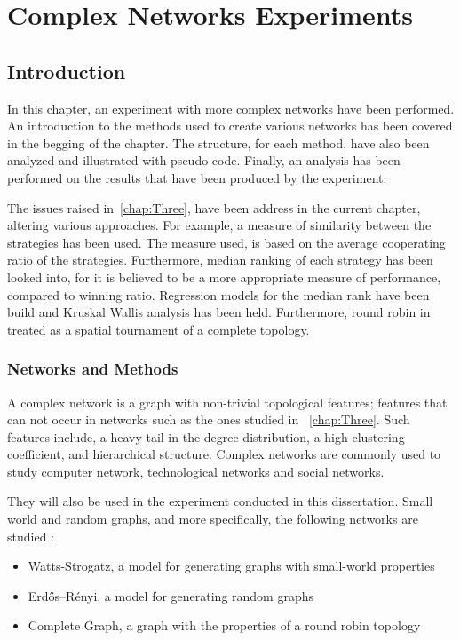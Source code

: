 \chapter{Complex Networks Experiments}
\label{chap:Four}

\section{Introduction}
In this chapter, an experiment with more complex networks have been performed.
An introduction to the methods used to create various networks has been
covered in the begging of the chapter. The structure, for each method,
have also been analyzed and illustrated with pseudo code. Finally, an analysis
has been performed on the results that have been produced by the experiment.

The issues raised in~\ref{chap:Three}, have been address in the current chapter,
altering various approaches. For example, a measure of similarity between the
strategies has been used. The measure used, is based on the average cooperating
ratio of the strategies. Furthermore, median ranking of each strategy has been
looked into, for it is believed to be a more appropriate measure of performance,
compared to winning ratio. Regression models for the median rank have been build
and Kruskal Wallis analysis has been held. Furthermore, round robin in treated as
a spatial tournament of a complete topology.

\subsection{Networks and Methods}
A complex network is a graph with non-trivial topological features;
features that can not occur in networks such as the ones studied in ~\ref{chap:Three}.
Such features include, a heavy tail in the degree distribution, a high
clustering coefficient, and hierarchical structure. Complex networks are commonly
used to study computer network, technological networks and social networks.

They will also be used in the experiment conducted in this dissertation. Small
world and random graphs, and more specifically, the following networks are
studied :

\begin{itemize}
	\item Watts-Strogatz, a model for generating graphs with small-world properties
	\item Erdős–Rényi, a model for generating random graphs
	\item Complete Graph, a graph with the properties of a round robin topology
\end{itemize}

